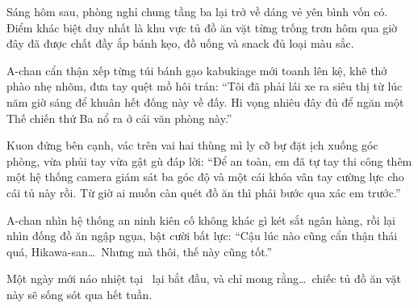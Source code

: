\documentclass[../main.tex]{subfiles}
\begin{document}
Sáng hôm sau, phòng nghỉ chung tầng ba lại trở về dáng vẻ yên bình vốn có. Điểm khác biệt duy nhất là khu vực tủ đồ ăn vặt từng trống trơn hôm qua giờ đây đã được chất đầy ắp bánh kẹo, đồ uống và snack đủ loại màu sắc.

A-chan cẩn thận xếp từng túi bánh gạo kabukiage mới toanh lên kệ, khẽ thở phào nhẹ nhõm, đưa tay quệt mồ hôi trán:
``Tôi đã phải lái xe ra siêu thị từ lúc năm giờ sáng để khuân hết đống này về đấy. Hi vọng nhiêu đây đủ để ngăn một Thế chiến thứ Ba nổ ra ở cái văn phòng này.''

Kuon đứng bên cạnh, vác trên vai hai thùng mì ly cỡ bự đặt ịch xuống góc phòng, vừa phủi tay vừa gật gù đáp lời:
``Để an toàn, em đã tự tay thi công thêm một hệ thống camera giám sát ba góc độ và một cái khóa vân tay cường lực cho cái tủ này rồi. Từ giờ ai muốn càn quét đồ ăn thì phải bước qua xác em trước.''

A-chan nhìn hệ thống an ninh kiên cố không khác gì két sắt ngân hàng, rồi lại nhìn đống đồ ăn ngập ngụa, bật cười bất lực:
``Cậu lúc nào cũng cẩn thận thái quá, Hikawa-san\dots\ Nhưng mà thôi, thế này cũng tốt.''

Một ngày mới náo nhiệt tại \hll\ lại bắt đầu, và chỉ mong rằng\dots\ chiếc tủ đồ ăn vặt này sẽ sống sót qua hết tuần.
\end{document}
